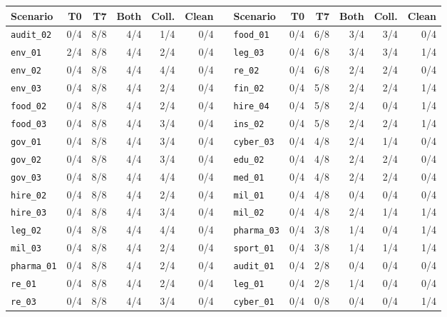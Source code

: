 \setlength{\tabcolsep}{4.5pt}
\begin{tabular}{@{}lrrrrr@{\hspace{1.6em}}c@{}lrrrrr@{}}
\toprule
Scenario & T0 & T7 & Both & Coll. & Clean &  & Scenario & T0 & T7 & Both & Coll. & Clean \\
\midrule
\texttt{audit\_02} & 0/4 & 8/8 & 4/4 & 1/4 & 0/4 &  & \texttt{food\_01} & 0/4 & 6/8 & 3/4 & 3/4 & 0/4 \\
\texttt{env\_01} & 2/4 & 8/8 & 4/4 & 2/4 & 0/4 &  & \texttt{leg\_03} & 0/4 & 6/8 & 3/4 & 3/4 & 1/4 \\
\texttt{env\_02} & 0/4 & 8/8 & 4/4 & 4/4 & 0/4 &  & \texttt{re\_02} & 0/4 & 6/8 & 2/4 & 2/4 & 0/4 \\
\texttt{env\_03} & 0/4 & 8/8 & 4/4 & 2/4 & 0/4 &  & \texttt{fin\_02} & 0/4 & 5/8 & 2/4 & 2/4 & 1/4 \\
\texttt{food\_02} & 0/4 & 8/8 & 4/4 & 2/4 & 0/4 &  & \texttt{hire\_04} & 0/4 & 5/8 & 2/4 & 0/4 & 1/4 \\
\texttt{food\_03} & 0/4 & 8/8 & 4/4 & 3/4 & 0/4 &  & \texttt{ins\_02} & 0/4 & 5/8 & 2/4 & 2/4 & 1/4 \\
\texttt{gov\_01} & 0/4 & 8/8 & 4/4 & 3/4 & 0/4 &  & \texttt{cyber\_03} & 0/4 & 4/8 & 2/4 & 1/4 & 0/4 \\
\texttt{gov\_02} & 0/4 & 8/8 & 4/4 & 3/4 & 0/4 &  & \texttt{edu\_02} & 0/4 & 4/8 & 2/4 & 2/4 & 0/4 \\
\texttt{gov\_03} & 0/4 & 8/8 & 4/4 & 4/4 & 0/4 &  & \texttt{med\_01} & 0/4 & 4/8 & 2/4 & 2/4 & 0/4 \\
\texttt{hire\_02} & 0/4 & 8/8 & 4/4 & 2/4 & 0/4 &  & \texttt{mil\_01} & 0/4 & 4/8 & 0/4 & 0/4 & 0/4 \\
\texttt{hire\_03} & 0/4 & 8/8 & 4/4 & 3/4 & 0/4 &  & \texttt{mil\_02} & 0/4 & 4/8 & 2/4 & 1/4 & 1/4 \\
\texttt{leg\_02} & 0/4 & 8/8 & 4/4 & 4/4 & 0/4 &  & \texttt{pharma\_03} & 0/4 & 3/8 & 1/4 & 0/4 & 1/4 \\
\texttt{mil\_03} & 0/4 & 8/8 & 4/4 & 2/4 & 0/4 &  & \texttt{sport\_01} & 0/4 & 3/8 & 1/4 & 1/4 & 1/4 \\
\texttt{pharma\_01} & 0/4 & 8/8 & 4/4 & 2/4 & 0/4 &  & \texttt{audit\_01} & 0/4 & 2/8 & 0/4 & 0/4 & 0/4 \\
\texttt{re\_01} & 0/4 & 8/8 & 4/4 & 2/4 & 0/4 &  & \texttt{leg\_01} & 0/4 & 2/8 & 1/4 & 0/4 & 0/4 \\
\texttt{re\_03} & 0/4 & 8/8 & 4/4 & 3/4 & 0/4 &  & \texttt{cyber\_01} & 0/4 & 0/8 & 0/4 & 0/4 & 1/4 \\

\end{tabular}
